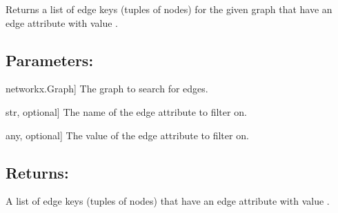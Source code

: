 \documentclass[letterpaper,10pt,english]{sphinxmanual}
\begin{document}

\begin{fulllineitems}
\label{\detokenize{pysewer:pysewer.helper.get_edge_keys}}
\pysigstartsignatures
{}
\pysigstopsignatures
\sphinxAtStartPar
Returns a list of edge keys (tuples of nodes) for the given graph  that have an edge attribute  with value .


\subsection{Parameters:}
\label{\detokenize{pysewer:id1}}\begin{description}
\sphinxlineitem{G}{[}networkx.Graph{]}
\sphinxAtStartPar
The graph to search for edges.

\sphinxlineitem{field}{[}str, optional{]}
\sphinxAtStartPar
The name of the edge attribute to filter on.

\sphinxlineitem{value}{[}any, optional{]}
\sphinxAtStartPar
The value of the edge attribute to filter on.

\end{description}


\subsection{Returns:}
\label{\detokenize{pysewer:id2}}\begin{description}
\sphinxAtStartPar
A list of edge keys (tuples of nodes) that have an edge attribute  with value .

\end{description}

\end{fulllineitems}

\end{document}
